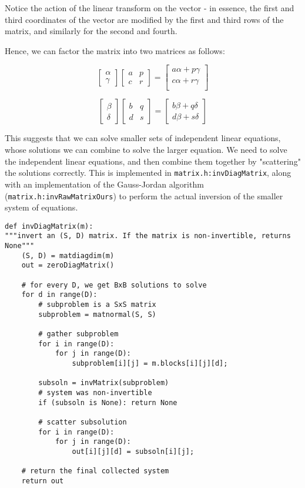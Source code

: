 \documentclass[11pt]{article}
\begin{document}
Notice the action of the linear transform on the vector - in essence,
the first and third coordinates of the vector are modified by the 
first and third rows of the matrix, and similarly for the second and
fourth.

Hence, we can factor the matrix into two matrices as follows:

\[
    \begin{bmatrix} \alpha \\ \gamma \end{bmatrix}
    \left [
        \begin{array}{cc}
            a & p \\
            c & r
        \end{array}
    \right ]
    =
    \begin{bmatrix}
        a \alpha + p \gamma \\
        c \alpha + r \gamma \\
    \end{bmatrix}
\]


\[
    \begin{bmatrix} \beta  \\ \delta \end{bmatrix}
    \left [
        \begin{array}{cc}
            b & q \\
            d & s
        \end{array}
    \right ]
    =
    \begin{bmatrix}
        b \beta + q \delta \\
        d \beta + s \delta 
    \end{bmatrix}
\]

This suggests that we can solve smaller sets of independent linear equations,
whose solutions we can combine to solve the larger equation. We need to
solve the independent linear equations, and then combine them together by
"scattering" the solutions correctly. This is implemented in 
\texttt{matrix.h:invDiagMatrix}, along with an implementation of the
Gauss-Jordan algorithm (\texttt{matrix.h:invRawMatrixOurs}) to perform the
actual inversion of the smaller system of equations.

\newpage
\begin{verbatim}
def invDiagMatrix(m):
"""invert an (S, D) matrix. If the matrix is non-invertible, returns None"""
    (S, D) = matdiagdim(m)
    out = zeroDiagMatrix()

    # for every D, we get BxB solutions to solve
    for d in range(D):
        # subproblem is a SxS matrix
        subproblem = matnormal(S, S)

        # gather subproblem
        for i in range(D):
            for j in range(D):
                subproblem[i][j] = m.blocks[i][j][d];

        subsoln = invMatrix(subproblem)
        # system was non-invertible
        if (subsoln is None): return None
        
        # scatter subsolution
        for i in range(D):
            for j in range(D):
                out[i][j][d] = subsoln[i][j];

    # return the final collected system
    return out
\end{verbatim}
\end{document}
